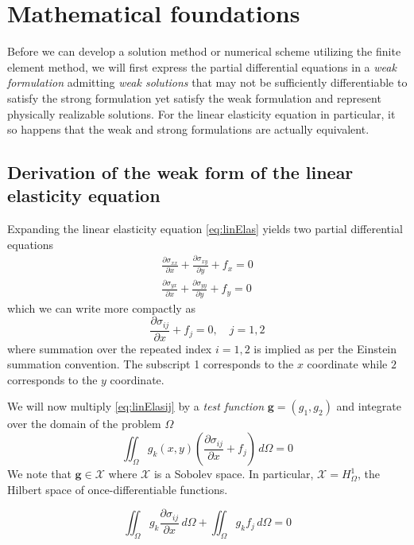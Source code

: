 \documentclass[11pt]{article}
\newcommand\p[2]{\frac{\partial #1}{\partial #2}}
\begin{document}
\section{Mathematical foundations}
Before we can develop a solution method or numerical scheme utilizing the finite element method, we will first express the partial differential equations in a \emph{weak formulation} admitting \emph{weak solutions} that may not be sufficiently differentiable to satisfy the strong formulation yet satisfy the weak formulation and represent physically realizable solutions. For the linear elasticity equation in particular, it so happens that the weak and strong formulations are actually equivalent.

\subsection{Derivation of the weak form of the linear elasticity equation}
Expanding the linear elasticity equation \eqref{eq:linElas} yields two partial differential equations
\begin{subequations}
\begin{gather}
  \p{\sigma_{xx}}{x} + \p{\sigma_{xy}}{y} + f_x = 0 \\
  \p{\sigma_{yx}}{x} + \p{\sigma_{yy}}{y} + f_y = 0
\end{gather}
\end{subequations}
which we can write more compactly as
\begin{equation} \label{eq:linElasij}
  \p{\sigma_{ij}}{x} + f_j = 0, \quad j=1,2
\end{equation}
where summation over the repeated index $i=1,2$ is implied as per the Einstein summation convention. The subscript 1 corresponds to the $x$ coordinate while $2$ corresponds to the $y$ coordinate.

We will now multiply \eqref{eq:linElasij} by a \emph{test function} $\bm{g} = (g_1,g_2)$ and integrate over the domain of the problem $\Omega$
\begin{equation}
  \iint_\Omega g_k(x,y) \left( \p{\sigma_{ij}}{x} + f_j \right) \, d\Omega = 0
\end{equation}
We note that $\bm{g} \in \mathcal{X}$ where $\mathcal{X}$ is a Sobolev space. In particular, $\mathcal{X} = H^1_\Omega$, the Hilbert space of once-differentiable functions.

\begin{equation}
\iint_\Omega g_k \p{\sigma_{ij}}{x} \, d\Omega + \iint_\Omega g_k f_j \, d\Omega = 0
\end{equation}
\end{document}
